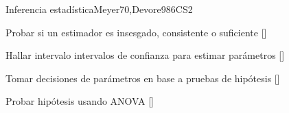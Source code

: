 \begin{syllabus}
\begin{unit}{}{Inferencia estadística}{Meyer70,Devore98}{6}{CS2}
   \begin{learningoutcomes}
      \item Probar si un estimador es insesgado, consistente o suficiente [\Usage]
      \item Hallar intervalo intervalos de confianza para estimar parámetros [\Usage]
      \item Tomar decisiones de parámetros en base a pruebas de hipótesis [\Usage]
      \item Probar hipótesis usando ANOVA [\Usage]
   \end{learningoutcomes}
\end{unit}




\begin{coursebibliography}
\end{coursebibliography}

\end{syllabus}

